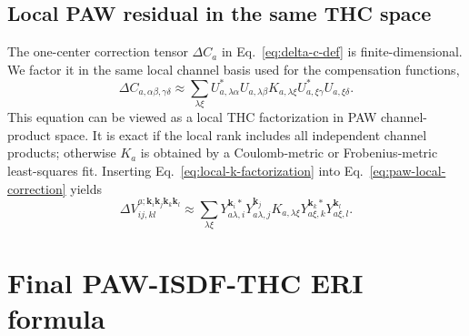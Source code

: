 \documentclass[aps,prb,reprint,superscriptaddress,longbibliography,nofootinbib]{revtex4-2}
\newcommand{\bk}{\mathbf k}
\begin{document}
\subsection{Local PAW residual in the same THC space}

The one-center correction tensor \(\Delta C_a\) in Eq.~\eqref{eq:delta-c-def} is finite-dimensional.  We factor it in the same local channel basis used for the compensation functions,
\begin{equation}
\Delta C_{a,\alpha\beta,\gamma\delta}
\approx
\sum_{\lambda\xi}
U_{a,\lambda\alpha}^*U_{a,\lambda\beta}
K_{a,\lambda\xi}
U_{a,\xi\gamma}^*U_{a,\xi\delta}.
\label{eq:local-k-factorization}
\end{equation}
This equation can be viewed as a local THC factorization in PAW channel-product space.  It is exact if the local rank includes all independent channel products; otherwise \(K_a\) is obtained by a Coulomb-metric or Frobenius-metric least-squares fit.  Inserting Eq.~\eqref{eq:local-k-factorization} into Eq.~\eqref{eq:paw-local-correction} yields
\begin{equation}
\Delta V_{ij,kl}^{a;\bk_i\bk_j\bk_k\bk_l}
\approx
\sum_{\lambda\xi}
Y_{a\lambda,i}^{\bk_i *}Y_{a\lambda,j}^{\bk_j}
K_{a,\lambda\xi}
Y_{a\xi,k}^{\bk_k *}Y_{a\xi,l}^{\bk_l}.
\label{eq:delta-v-local-thc}
\end{equation}

\section{Final PAW-ISDF-THC ERI formula}
\label{sec:final}
\end{document}
